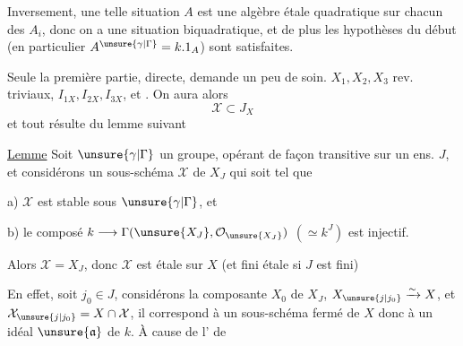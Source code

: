 Inversement,  une telle situation  $A$ est une algèbre étale quadratique sur chacun des $A_i$, donc on a une situation biquadratique, et de plus les hypothèses du début (en particulier $A^{\unsure{\gamma|\Gamma}}=k.1_A$) sont satisfaites.

 Seule la première partie, directe, demande un peu de soin.  $X_1,X_2,X_3$ rev. triviaux, $I_{1X},I_{2X},I_{3X}$, et  .  On aura alors
\[
 \mathcal X\subset J_X
\]
et tout résulte du lemme suivant

\uline{Lemme} Soit $\unsure{\gamma|\Gamma}$ un groupe, opérant de façon transitive sur un ens. $J$, et considérons un sous-schéma $\mathcal X$ de $X_J$  qui soit tel que

a) $\mathcal X$ est stable sous $\unsure{\gamma|\Gamma}$, et

b) le composé $k\longrightarrow\Gamma(\unsure{X_J},\mathcal O_{\unsure{X_J}})$ $(\simeq k^J)$ est injectif.

Alors $\mathcal X=X_J$, donc $\mathcal X$ est étale sur $X$ (et fini étale si $J$ est fini)

En effet, soit $j_0\in J$, considérons la composante $X_0$ de $X_J$, $X_{\unsure{j|j_0}}\xrightarrow{\sim}X$, et $\mathcal X_{\unsure{j|j_0}}=X\cap\mathcal X$, il correspond à un sous-schéma fermé de $X$ donc à un idéal $\unsure{\mathfrak a}$ de $k$. À cause de l' de

